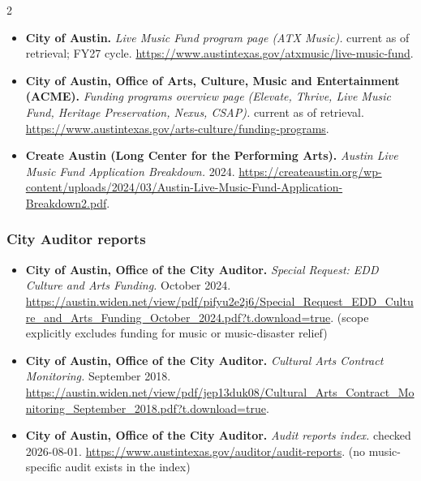 {\begin{multicols}{2}
\begin{itemize}[itemsep=0pt,topsep=1pt,parsep=0pt,partopsep=0pt,leftmargin=1em]
\item \textbf{City of Austin.} \textit{Live Music Fund program page (ATX Music).} current as of retrieval; FY27 cycle. \url{https://www.austintexas.gov/atxmusic/live-music-fund}.
\item \textbf{City of Austin, Office of Arts, Culture, Music and Entertainment (ACME).} \textit{Funding programs overview page (Elevate, Thrive, Live Music Fund, Heritage Preservation, Nexus, CSAP).} current as of retrieval. \url{https://www.austintexas.gov/arts-culture/funding-programs}.
\item \textbf{Create Austin (Long Center for the Performing Arts).} \textit{Austin Live Music Fund Application Breakdown.} 2024. \url{https://createaustin.org/wp-content/uploads/2024/03/Austin-Live-Music-Fund-Application-Breakdown2.pdf}.
\end{itemize}
\subsubsection*{City Auditor reports}
\begin{itemize}[itemsep=0pt,topsep=1pt,parsep=0pt,partopsep=0pt,leftmargin=1em]
\item \textbf{City of Austin, Office of the City Auditor.} \textit{Special Request: EDD Culture and Arts Funding.} October 2024. \url{https://austin.widen.net/view/pdf/pifyu2e2j6/Special_Request_EDD_Culture_and_Arts_Funding_October_2024.pdf?t.download=true}. {\color{ammuted}(scope explicitly excludes funding for music or music-disaster relief)}
\item \textbf{City of Austin, Office of the City Auditor.} \textit{Cultural Arts Contract Monitoring.} September 2018. \url{https://austin.widen.net/view/pdf/jep13duk08/Cultural_Arts_Contract_Monitoring_September_2018.pdf?t.download=true}.
\item \textbf{City of Austin, Office of the City Auditor.} \textit{Audit reports index.} checked 2026-08-01. \url{https://www.austintexas.gov/auditor/audit-reports}. {\color{ammuted}(no music-specific audit exists in the index)}
\end{itemize}
\end{multicols}
}


